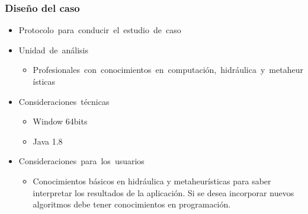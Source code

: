 \documentclass[9pt]{beamer}
\begin{document}
    \begin{frame}
        \frametitle{Diseño del caso}                       
        
        \begin{itemize}
            \item Protocolo para conducir el estudio de caso
            \item Unidad de análisis
            \begin{itemize}
                \item Profesionales con conocimientos en computación, hidráulica y metaheurísticas
            \end{itemize}

            \item Consideraciones técnicas	  
            \begin{itemize}
                \item Window 64bits
                \item Java 1.8
            \end{itemize}

            \item Consideraciones para los usuarios
            \begin{itemize}
                \item Conocimientos básicos en hidráulica y metaheurísticas para saber interpretar los resultados de la aplicación. Si se desea incorporar nuevos algoritmos debe tener conocimientos en programación.
        
            \end{itemize}
        \end{itemize}

    \end{frame}

        
        
\end{document}
